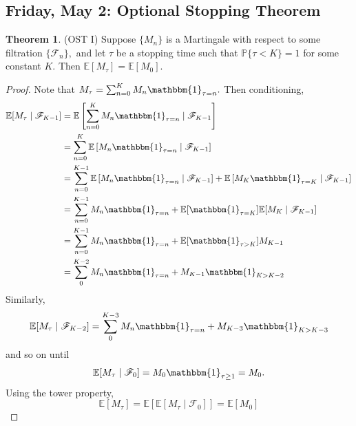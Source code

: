 \documentclass[10pt, oneside]{article}
\newcommand{\bbP}{\mathbb{P}}
\newcommand{\bbE}{\mathbb{E}}
\theoremstyle{definition}
\newtheorem{thm}{Theorem}
\begin{document}
\subsection*{Friday, May 2: Optional Stopping Theorem}
\begin{thm}
(OST I)
    Suppose $\{M_n\}$ is a Martingale with respect to some filtration $\{\mathcal{F}_n\},$ and let $\tau$ be a stopping time such that $\bbP\{\tau < K\} = 1$ for some constant $K.$ Then $\bbE[M_\tau] = \bbE[M_0].$
\end{thm}
\begin{proof}
    Note that $M_\tau = \sum_{n=0}^K M_n \mathbbm{1}_{\tau = n}.$ Then conditioning,
    \begin{align*}
        \bbE[M_\tau \mid \mathcal{F}_{K-1}] &= \bbE\left[\sum_{n=0}^K M_n \mathbbm{1}_{\tau = n} \mid \mathcal{F}_{K-1}\right]\\
        &= \sum_{n=0}^K \bbE\left[M_n \mathbbm{1}_{\tau = n}\mid \mathcal{F}_{K-1}\right]\\
        &= \sum_{n=0}^{K-1}\bbE\left[M_n \mathbbm{1}_{\tau = n}\mid \mathcal{F}_{K-1}\right] + \bbE\left[M_K \mathbbm{1}_{\tau = K}\mid \mathcal{F}_{K-1}\right]\\
        &= \sum_{n=0}^{K-1}M_n \mathbbm{1}_{\tau = n} + \bbE[\mathbbm{1}_{\tau = K}] \bbE[M_K \mid \mathcal{F}_{K-1}]\\
        &= \sum_{n=0}^{K-1}M_n \mathbbm{1}_{\tau = n} + \bbE[\mathbbm{1}_{\tau > K}] M_{K-1}\\
        &= \sum_{0}^{K-2}M_n \mathbbm{1}_{\tau = n} + M_{K-1}\mathbbm{1}_{K >K-2}
    \end{align*}
    Similarly, 
    \[\bbE[M_\tau \mid \mathcal{F}_{K-2}] = \sum_{0}^{K-3}M_n \mathbbm{1}_{\tau = n} + M_{K-3}\mathbbm{1}_{K >K-3}\] and so on until 
    \[\bbE[M_\tau \mid \mathcal{F}_0] = M_0\mathbbm{1}_{\tau \geq 1} = M_0.\] Using the tower property, 
    \[\bbE[M_\tau] = \bbE[\bbE[M_\tau \mid \mathcal{F}_0]] = \bbE[M_0]\]
\end{proof}
\end{document}
